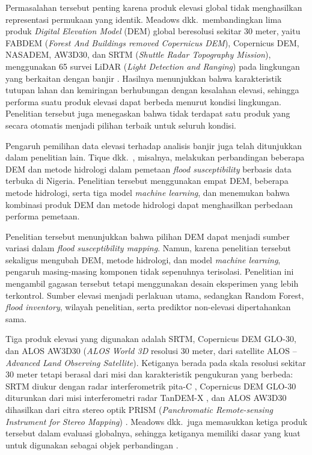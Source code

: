 \documentclass[12pt]{article}
\begin{document}
Permasalahan tersebut penting karena produk elevasi global tidak menghasilkan
representasi permukaan yang identik. Meadows dkk.\ membandingkan lima produk
\textit{Digital Elevation Model} (DEM) global beresolusi sekitar 30 meter,
yaitu FABDEM (\textit{Forest And Buildings removed Copernicus DEM}),
Copernicus DEM, NASADEM, AW3D30, dan SRTM (\textit{Shuttle Radar Topography
Mission}), menggunakan 65 survei LiDAR (\textit{Light Detection and Ranging})
pada lingkungan yang
berkaitan dengan banjir \cite{meadows2024}. Hasilnya menunjukkan bahwa
karakteristik tutupan lahan dan kemiringan berhubungan dengan kesalahan
elevasi, sehingga performa suatu produk elevasi dapat berbeda menurut kondisi
lingkungan. Penelitian tersebut juga menegaskan bahwa tidak terdapat satu
produk yang secara otomatis menjadi pilihan terbaik untuk seluruh kondisi.

Pengaruh pemilihan data elevasi terhadap analisis banjir juga telah
ditunjukkan dalam penelitian lain. Tique dkk.\ \cite{Tique2026}, misalnya,
melakukan perbandingan beberapa DEM dan metode hidrologi dalam pemetaan
\textit{flood susceptibility} berbasis data terbuka di Nigeria. Penelitian tersebut
menggunakan empat DEM, beberapa metode hidrologi, serta tiga model
\textit{machine learning}, dan menemukan bahwa kombinasi produk DEM dan
metode hidrologi dapat menghasilkan perbedaan performa pemetaan.

Penelitian tersebut menunjukkan bahwa pilihan DEM dapat menjadi sumber
variasi dalam \textit{flood susceptibility mapping}. Namun, karena penelitian
tersebut sekaligus mengubah DEM, metode hidrologi, dan model \textit{machine
learning}, pengaruh masing-masing komponen tidak sepenuhnya terisolasi.
Penelitian ini mengambil gagasan tersebut tetapi menggunakan desain
eksperimen yang lebih terkontrol. Sumber elevasi menjadi perlakuan utama,
sedangkan Random Forest, \textit{flood inventory}, wilayah penelitian, serta
prediktor non-elevasi dipertahankan sama.

Tiga produk elevasi yang digunakan adalah SRTM, Copernicus DEM GLO-30, dan
ALOS AW3D30 (\textit{ALOS World 3D} resolusi 30 meter, dari satellite
ALOS -- \textit{Advanced Land Observing Satellite}). Ketiganya berada pada
skala resolusi sekitar 30 meter tetapi
berasal dari misi dan karakteristik pengukuran yang berbeda: SRTM diukur
dengan radar interferometrik pita-C \cite{farr2007}, Copernicus DEM GLO-30
diturunkan dari misi interferometri radar TanDEM-X \cite{esa_glo30}, dan
ALOS AW3D30 dihasilkan dari citra stereo optik PRISM
(\textit{Panchromatic Remote-sensing Instrument for Stereo Mapping})
\cite{tadono2016}. Meadows dkk.\ juga
memasukkan ketiga produk tersebut dalam evaluasi globalnya, sehingga ketiganya
memiliki dasar yang kuat untuk digunakan sebagai objek perbandingan
\cite{meadows2024}.
\end{document}
